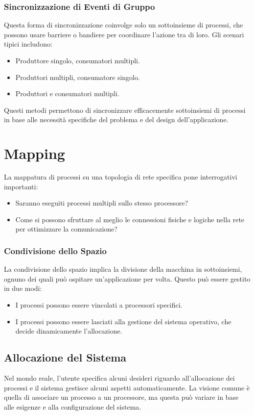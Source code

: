 \subsubsection{Sincronizzazione di Eventi di Gruppo}
Questa forma di sincronizzazione coinvolge solo un 
sottoinsieme di processi, che possono usare barriere 
o bandiere per coordinare l'azione tra di loro. Gli 
scenari tipici includono:
\begin{itemize}
    \item Produttore singolo, consumatori multipli.
    \item Produttori multipli, consumatore singolo.
    \item Produttori e consumatori multipli.
\end{itemize}

Questi metodi permettono di sincronizzare efficacemente
sottoinsiemi di processi in base alle necessità specifiche
del problema e del design dell'applicazione.

\section{Mapping}
La mappatura di processi su una topologia di rete specifica
pone interrogativi importanti:
\begin{itemize}
    \item Saranno eseguiti processi multipli sullo stesso
    processore?
    \item Come si possono sfruttare al meglio le
    connessioni fisiche e logiche nella rete per
    ottimizzare la comunicazione?
\end{itemize}

\subsubsection{Condivisione dello Spazio}
La condivisione dello spazio implica la divisione
della macchina in sottoinsiemi, ognuno dei quali può
ospitare un'applicazione per volta. Questo può essere
gestito in due modi:
\begin{itemize}
    \item I processi possono essere vincolati a processori
    specifici.
    \item I processi possono essere lasciati alla gestione
    del sistema operativo, che decide dinamicamente
    l'allocazione.
\end{itemize}

\subsection*{Allocazione del Sistema}
Nel mondo reale, l'utente specifica alcuni desideri
riguardo all'allocazione dei processi e il sistema
gestisce alcuni aspetti automaticamente. La visione
comune è quella di associare un processo a un processore,
ma questa può variare in base alle esigenze e alla
configurazione del sistema.

